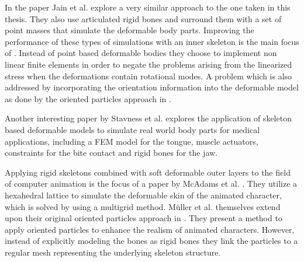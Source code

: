 In the paper \cite{Jain:2011hb} Jain et al. explore a very similar approach to the one taken in this thesis. They also use articulated rigid bones and surround them with a set of point masses that simulate the deformable body parts. Improving the performance of these types of simulations with an inner skeleton is the main focus of \cite{Kim:2011iq}. Instead of point based deformable bodies they choose to implement non linear finite elements in order to negate the problems arising from the linearized stress when the deformations contain rotational modes. A problem which is also addressed by incorporating the orientation information into the deformable model as done by the oriented particles approach in \cite{Muller:2011gn}. 

Another interesting paper by Stavness et al. \cite{Stavness:2011fn} explores the application of skeleton based deformable models to simulate real world body parts for medical applications, including a FEM model for the tongue, muscle actuators, constraints for the bite contact and rigid bones for the jaw.

Applying rigid skeletons combined with soft deformable outer layers to the field of computer animation is the focus of a paper by McAdams et al. \cite{McAdams:2011ht}. They utilize a hexahedral lattice to simulate the deformable skin of the animated character, which is solved by using a multigrid method. M{\"u}ller et al. themselves extend upon their original oriented particles approach in \cite{Muller:2011vu}. They present a method to apply oriented particles to enhance the realism of animated characters. However, instead of explicitly modeling the bones as rigid bones they link the particles to a regular mesh representing the underlying skeleton structure.